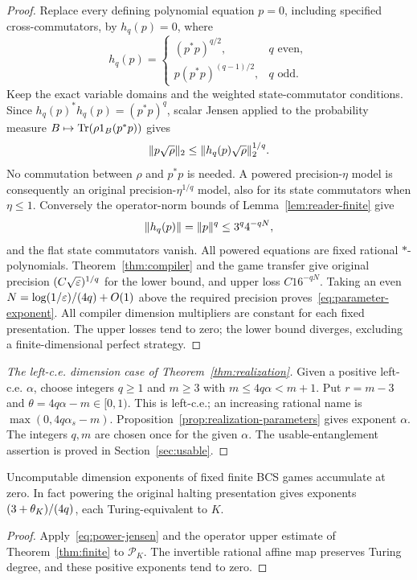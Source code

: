 \begin{proof}
Replace every defining polynomial equation $p=0$, including specified cross-commutators, by $h_q(p)=0$, where
\begin{equation}\label{eq:power-polynomial}
 h_q(p)=\begin{cases}
 (p^*p)^{q/2},&q\text{ even},\\
 p(p^*p)^{(q-1)/2},&q\text{ odd}.
 \end{cases}
\end{equation}
Keep the exact variable domains and the weighted state-commutator conditions. Since $h_q(p)^*h_q(p)=(p^*p)^q$, scalar Jensen applied to the probability measure $B\mapsto\operatorname{Tr}(\rho1_B(p^*p))$ gives
\begin{equation}\label{eq:power-jensen}
 \lVert p\sqrt\rho\rVert_2\le\lVert h_q(p)\sqrt\rho\rVert_2^{1/q}.
\end{equation}
No commutation between $\rho$ and $p^*p$ is needed. A powered precision-$\eta$ model is consequently an original precision-$\eta^{1/q}$ model, also for its state commutators when $\eta\le1$. Conversely the operator-norm bounds of Lemma~\ref{lem:reader-finite} give
\[
 \lVert h_q(p)\rVert=\lVert p\rVert^q\le3^q4^{-qN},
\]
and the flat state commutators vanish. All powered equations are fixed rational $*$-polynomials. Theorem~\ref{thm:compiler} and the game transfer give original precision $(C\sqrt{\varepsilon})^{1/q}$ for the lower bound, and upper loss $C16^{-qN}$. Taking an even $N=\log(1/\varepsilon)/(4q)+O(1)$ above the required precision proves~\eqref{eq:parameter-exponent}. All compiler dimension multipliers are constant for each fixed presentation. The upper losses tend to zero; the lower bound diverges, excluding a finite-dimensional perfect strategy.
\end{proof}

\begin{proof}[The left-c.e. dimension case of Theorem~\ref{thm:realization}]
Given a positive left-c.e. $\alpha$, choose integers $q\ge1$ and $m\ge3$ with $m\le4q\alpha<m+1$. Put $r=m-3$ and $\theta=4q\alpha-m\in[0,1)$. This is left-c.e.; an increasing rational name is $\max(0,4q\alpha_s-m)$. Proposition~\ref{prop:realization-parameters} gives exponent $\alpha$. The integers $q,m$ are chosen once for the given $\alpha$. The usable-entanglement assertion is proved in Section~\ref{sec:usable}.
\end{proof}

\begin{corollary}\label{cor:accumulation}
Uncomputable dimension exponents of fixed finite BCS games accumulate at zero. In fact powering the original halting presentation gives exponents $(3+\theta_K)/(4q)$, each Turing-equivalent to $K$.
\end{corollary}
\begin{proof}
Apply~\eqref{eq:power-jensen} and the operator upper estimate of Theorem~\ref{thm:finite} to $\mathcal P_K$. The invertible rational affine map preserves Turing degree, and these positive exponents tend to zero.
\end{proof}
